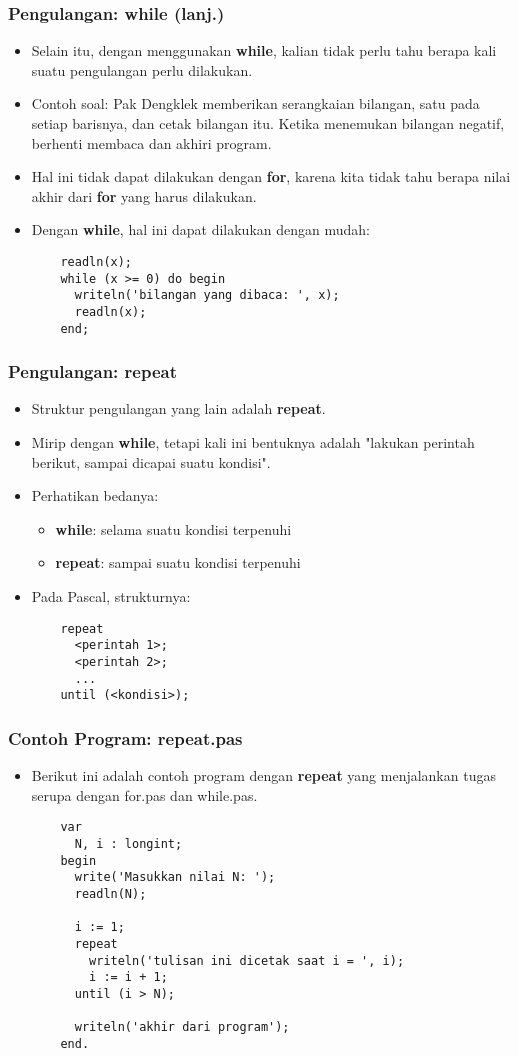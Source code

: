 \documentclass{beamer}
\begin{document}
\begin{frame}[fragile]
\frametitle{Pengulangan: while (lanj.)}
\begin{itemize}
  \item Selain itu, dengan menggunakan \textbf{while}, kalian tidak perlu tahu berapa kali suatu pengulangan perlu dilakukan.
  \item Contoh soal: Pak Dengklek memberikan serangkaian bilangan, satu pada setiap barisnya, dan cetak bilangan itu. Ketika menemukan bilangan negatif, berhenti membaca dan akhiri program.
  \item Hal ini tidak dapat dilakukan dengan \textbf{for}, karena kita tidak tahu berapa nilai akhir dari \textbf{for} yang harus dilakukan.
  \item Dengan \textbf{while}, hal ini dapat dilakukan dengan mudah:
  \begin{lstlisting}
    readln(x);
    while (x >= 0) do begin
      writeln('bilangan yang dibaca: ', x);
      readln(x);
    end;
  \end{lstlisting}
\end{itemize}
\end{frame}

\begin{frame}[fragile]
\frametitle{Pengulangan: repeat}
\begin{itemize}
  \item Struktur pengulangan yang lain adalah \textbf{repeat}.
  \item Mirip dengan \textbf{while}, tetapi kali ini bentuknya adalah "lakukan perintah berikut, sampai dicapai suatu kondisi".
  \item Perhatikan bedanya:
  \begin{itemize}
    \item \textbf{while}: selama suatu kondisi terpenuhi
    \item \textbf{repeat}: sampai suatu kondisi terpenuhi
  \end{itemize}
  \item Pada Pascal, strukturnya:
  \begin{lstlisting}
    repeat
      <perintah 1>;
      <perintah 2>;
      ...
    until (<kondisi>);
  \end{lstlisting}
\end{itemize}
\end{frame}

\begin{frame}[fragile]
\frametitle{Contoh Program: repeat.pas}
\begin{itemize}
  \item Berikut ini adalah contoh program dengan \textbf{repeat} yang menjalankan tugas serupa dengan for.pas dan while.pas.
  \begin{lstlisting}
    var
      N, i : longint;
    begin
      write('Masukkan nilai N: ');
      readln(N);

      i := 1;
      repeat
        writeln('tulisan ini dicetak saat i = ', i);
        i := i + 1;
      until (i > N);

      writeln('akhir dari program');
    end.
  \end{lstlisting}
\end{itemize}
\end{frame}
\end{document}
